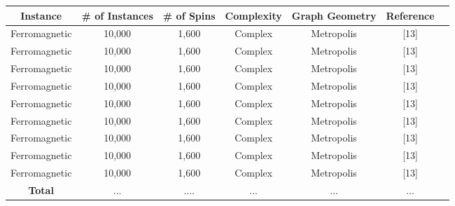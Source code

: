 \documentclass{standalone}
\begin{document}
\begin{tabular}{ |c|c|c|c|c|c|c| } 
    \hline
    \textbf{Instance} & \textbf{\# of Instances} & \textbf{\# of Spins} & \textbf{Complexity} & \textbf{Graph Geometry} & \textbf{Reference}\\ 
    \hline
    Ferromagnetic & 10,000 & 1,600 & Complex & Metropolis & [13] \\
    Ferromagnetic & 10,000 & 1,600 & Complex & Metropolis & [13] \\
    Ferromagnetic & 10,000 & 1,600 & Complex & Metropolis & [13] \\
    Ferromagnetic & 10,000 & 1,600 & Complex & Metropolis & [13] \\
    Ferromagnetic & 10,000 & 1,600 & Complex & Metropolis & [13] \\
    Ferromagnetic & 10,000 & 1,600 & Complex & Metropolis & [13] \\
    Ferromagnetic & 10,000 & 1,600 & Complex & Metropolis & [13] \\
    Ferromagnetic & 10,000 & 1,600 & Complex & Metropolis & [13] \\
    Ferromagnetic & 10,000 & 1,600 & Complex & Metropolis & [13] \\    
    \hline
    \textbf{Total} & ... & .... & ... & ... & ... \\
    \hline
\end{tabular}
\end{document}
